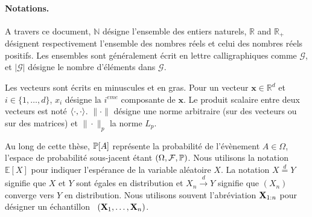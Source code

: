 \paragraph{Notations.}

A travers ce document, $\mathbb{N}$ désigne l'ensemble des entiers naturels, $\mathbb{R}$ and $\mathbb{R}_+$ désignent respectivement l'ensemble des nombres réels et celui des nombres réels positifs. Les ensembles  sont généralement écrit en lettre calligraphiques comme $\mathcal{G}$, et $|\mathcal{G}|$ désigne le nombre d'éléments dans $\mathcal{G}$. 

Les vecteurs sont écrits en minuscules et en gras. Pour un vecteur $\mathbf{x}\in\mathbb{R}^d$ et $i\in \{1,\dots,d\}$, $x_i$ désigne la $i^{eme}$ composante de $\mathbf{x}$. Le produit scalaire entre deux vecteurs est noté $\left\langle \cdot,\cdot \right\rangle$. $\|\cdot\|$ désigne une norme arbitraire (sur des vecteurs ou sur des matrices) et $\|\cdot\|_p$ la norme $L_p$.

Au long de cette thèse, $\mathbb{P}[A]$ représente la probabilité de l'évènement $A\in \Omega$, l'espace de probabilité sous-jacent étant $(\Omega, \mathcal{F}, \mathbb{P})$. Nous utilisons la notation $\mathbb{E}[X]$ pour indiquer l'espérance de la variable aléatoire $X$. La notation $X \overset{d}{=} Y$ signifie que $X$ et $Y$ sont égales en distribution et $X_n \overset{d}{\to} Y$ signifie que $(X_n)$ converge vers $Y$ en distribution. Nous utilisons souvent l'abréviation $\mathbf X_{1:n}$ pour désigner un échantillon \iid~$(\mathbf X_1,\ldots,\mathbf X_n)$.


